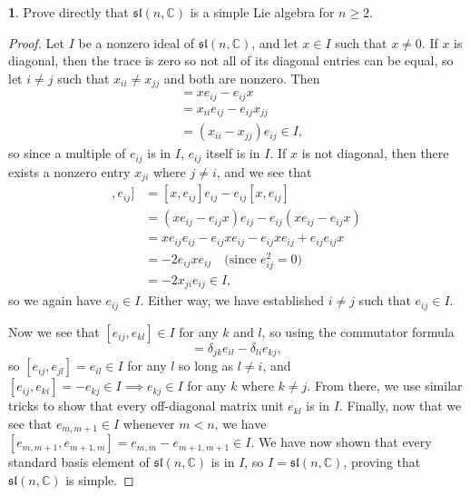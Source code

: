 \documentclass[12pt]{article}
\renewcommand{\sl}{\mathfrak{sl}}
\theoremstyle{definition}
\newtheorem{ex}{}
\begin{document}
\begin{ex}
	Prove directly that $\sl(n, \mathbb{C})$ is a simple Lie algebra for $n \geq 2$.
\end{ex}
\begin{proof}
	Let $I$ be a nonzero ideal of $\sl(n, \mathbb{C})$, and let $x \in I$ such that $x \neq 0$.
	If $x$ is diagonal, then the trace is zero so not all of its diagonal entries can be equal, so let $i \neq j$ such that $x_{ii} \neq x_{jj}$ and both are nonzero.
	Then \begin{align*}
		[x, e_{ij}] & = xe_{ij} - e_{ij}x            \\
		            & = x_{ii}e_{ij} - e_{ij}x_{jj}  \\
		            & = (x_{ii}-x_{jj})e_{ij} \in I,
	\end{align*}
	so since a multiple of $e_{ij}$ is in $I$, $e_{ij}$ itself is in $I$.
	If $x$ is not diagonal, then there exists a nonzero entry $x_{ji}$ where $j \neq i$, and we see that \begin{align*}
		[[x, e_{ij}], e_{ij}] & = [x, e_{ij}]e_{ij} - e_{ij}[x, e_{ij}]                         \\
		                      & = (xe_{ij} - e_{ij}x)e_{ij} - e_{ij}(xe_{ij} - e_{ij}x)         \\
		                      & = xe_{ij}e_{ij} - e_{ij}xe_{ij} - e_{ij}xe_{ij} + e_{ij}e_{ij}x \\
		                      & = -2e_{ij}xe_{ij} \hspace{1em} \text{(since $e_{ij}^2 = 0$)}    \\
		                      & = -2x_{ji}e_{ij} \in I,
	\end{align*}
	so we again have $e_{ij} \in I$.
	Either way, we have established $i \neq j$ such that $e_{ij} \in I$.

	Now we see that $[e_{ij}, e_{kl}] \in I$ for any $k$ and $l$, so using the commutator formula \begin{equation*}
		[e_{ij}, e_{kl}] = \delta_{jk}e_{il} - \delta_{li}e_{kj},
	\end{equation*}
	so $[e_{ij}, e_{jl}] = e_{il} \in I$ for any $l$ so long as $l \neq i$, and $[e_{ij}, e_{ki}] = -e_{kj} \in I \implies e_{kj} \in I$ for any $k$ where $k \neq j$.
	From there, we use similar tricks to show that every off-diagonal matrix unit $e_{kl}$ is in $I$.
	Finally, now that we see that $e_{m,m+1} \in I$ whenever $m < n$, we have $[e_{m, m+1}, e_{m+1, m}] = e_{m,m} - e_{m+1,m+1} \in I$.
	We have now shown that every standard basis element of $\sl(n, \mathbb{C})$ is in $I$, so $I = \sl(n, \mathbb{C})$, proving that $\sl(n, \mathbb{C})$ is simple.
\end{proof}
\end{document}
